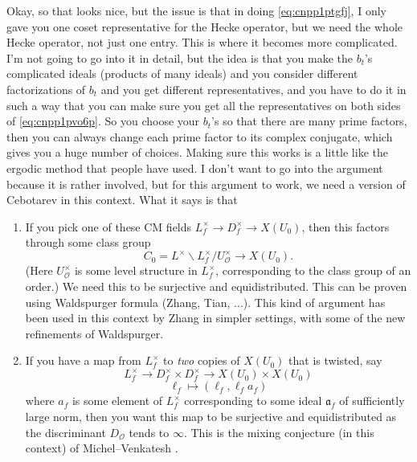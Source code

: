 \documentclass[reqno]{amsart} 
\begin{document}
Okay, so that looks nice, but the issue is that in doing \eqref{eq:cnpp1ptgfj}, I only gave you one coset representative for the Hecke operator, but we need the whole Hecke operator, not just one entry.  This is where it becomes more complicated.  I'm not going to go into it in detail, but the idea is that you make the $b_t$'s complicated ideals (products of many ideals) and you consider different factorizations of $b_t$ and you get different representatives, and you have to do it in such a way that you can make sure you get all the representatives on both sides of \eqref{eq:cnpp1pvo6p}.  So you choose your $b_t$'s so that there are many prime factors, then you can always change each prime factor to its complex conjugate, which gives you a huge number of choices.  Making sure this works is a little like the ergodic method that people have used.  I don't want to go into the argument because it is rather involved, but for this argument to work, we need a version of Cebotarev in this context.  What it says is that
\begin{enumerate}
\item\label{enumerate:cnpp1p8snz} If you pick one of these CM fields $L_f^\times \rightarrow D_f^\times \rightarrow X(U_0)$, then this factors through some class group
  \begin{equation*}
    C_0 = L^\times \backslash L_f^\times / U_{\mathcal{O}}^\times \rightarrow X(U_0).
  \end{equation*}
  (Here $U_{\mathcal{O}}^\times$ is some level structure in $L_f^\times$, corresponding to the class group of an order.)  We need this to be surjective and equidistributed.  This can be proven using Waldspurger formula (Zhang, Tian, ...).  This kind of argument has been used in this context by Zhang in simpler settings, with some of the new refinements of Waldspurger.
\item\label{enumerate:cnpp1p8trm} If you have a map from $L_f^\times$ to \emph{two } copies of $X(U_0)$ that is twisted, say
  \begin{equation*}
    L_f^\times \rightarrow
    D_f^\times \times D_f^\times
    \rightarrow 
    X(U_0) \times X(U_0)
  \end{equation*}
  \begin{equation*}
    \ell_f \mapsto(\ell_f, \ell_f a_f)
  \end{equation*}
  where $a_f$ is some element of $L_f^\times$ corresponding to some ideal $\mathfrak{a}_f$ of sufficiently large norm, then you want this map to be surjective and equidistributed as the discriminant $D_{\mathcal{O}}$ tends to $\infty$.  This is the mixing conjecture (in this context) of Michel--Venkatesh \cite{MichelVenkateshICM}.
\end{enumerate}
\end{document}
